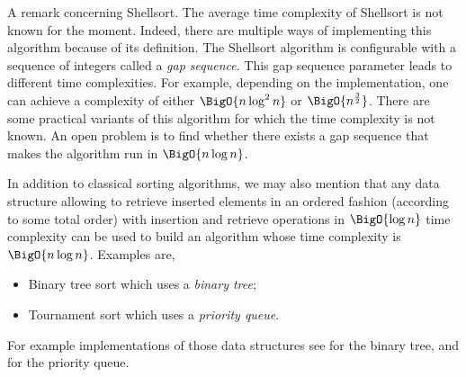 A remark concerning Shellsort. The average time complexity of Shellsort is not
known for the moment. Indeed, there are multiple ways of implementing this
algorithm because of its definition. The Shellsort algorithm is configurable
with a sequence of integers called a \emph{gap sequence}. This gap sequence
parameter leads to different time complexities. For example, depending on the
implementation, one can achieve a complexity of either $\BigO{n \log^2 n}$ or
$\BigO{n^{\frac{3}{2}}}$. There are some practical variants of this algorithm
for which the time complexity is not known. An open problem is to find whether
there exists a gap sequence that makes the algorithm run in $\BigO{n \log
n}$.

In addition to classical sorting algorithms, we may also mention that any data
structure allowing to retrieve inserted elements in an ordered fashion
(according to some total order) with insertion and retrieve operations in
$\BigO{\log n}$ time complexity can be used to build an algorithm whose time
complexity is $\BigO{n \log n}$. Examples are,

\begin{itemize}
\item Binary tree sort which uses a \emph{binary tree};
\item Tournament sort which uses a \emph{priority queue}.
\end{itemize}

For example implementations of those data structures see
\citet*{sleator:1985} for the binary tree, and
\citet*{leiserson:2001} for the priority queue.
